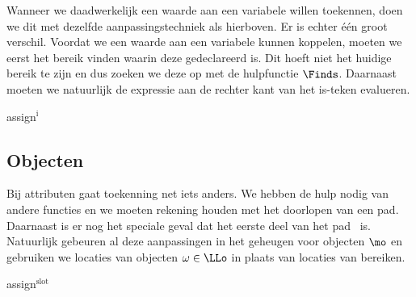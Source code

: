 Wanneer we daadwerkelijk een waarde aan een variabele willen toekennen, doen we dit met dezelfde aanpassingstechniek als hierboven. Er is echter één groot verschil. Voordat we een waarde aan een variabele kunnen koppelen, moeten we eerst het bereik vinden waarin deze gedeclareerd is. Dit hoeft niet het huidige bereik te zijn en dus zoeken we deze op met de hulpfunctie $\Finds$. Daarnaast moeten we natuurlijk de expressie aan de rechter kant van het is-teken evalueren.

\begin{NSAxiom}{assign$^\text{i}$}
  \begin{prooftree}
  \end{prooftree}
  \begin{NSConditions}
  \end{NSConditions}
\end{NSAxiom}

\subsection{Objecten}

Bij attributen gaat toekenning net iets anders. We hebben de hulp nodig van andere functies en we moeten rekening houden met het doorlopen van een pad. Daarnaast is er nog het speciale geval dat het eerste deel van het pad \THIS\ is. Natuurlijk gebeuren al deze aanpassingen in het geheugen voor objecten $\mo$ en gebruiken we locaties van objecten $\omega\in\LLo$ in plaats van locaties van bereiken.

\begin{NSAxiom}{assign$^\text{slot}$}
  \begin{prooftree}
  \end{prooftree}
  \begin{NSConditions}
  \end{NSConditions}
\end{NSAxiom}

